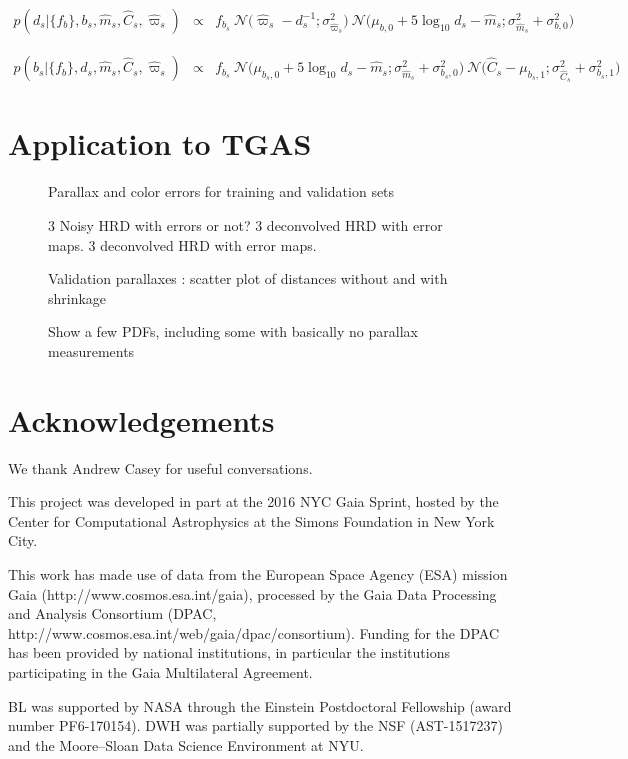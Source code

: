 \documentclass[aps,prd,showpacs,superscriptaddress,groupedaddress]{revtex4}  %
\newcommand{\eqn}[1]{\begin{eqnarray}#1\end{eqnarray}}
\begin{document}
\eqn{
	p\left(d_s \bigr\rvert \bigl\{ f_b \bigr\}, b_s, \hat{m}_s, \hat{C}_s, \hat{\varpi}_s\right) &\propto& f_{b_s} \ \mathcal{N}\bigl(\hat{\varpi}_s - d_s^{-1};\sigma_{\hat{\varpi}_s}^2 \bigr) \  \mathcal{N}\bigl( \mu_{b,0} + 5\log_{10}d_s  -\hat{m}_s ;\sigma_{\hat{m}_s}^2 + \sigma_{b,0}^2 \bigr) 
}


\eqn{
	p\left(b_s \bigr\rvert \bigl\{ f_b \bigr\}, d_s, \hat{m}_s, \hat{C}_s, \hat{\varpi}_s\right) &\propto& f_{b_s} \  \mathcal{N}\bigl( \mu_{b_s,0} + 5\log_{10}d_s  -\hat{m}_s ;\sigma_{\hat{m}_s}^2 + \sigma_{b_s,0}^2 \bigr) \  \mathcal{N}\bigl(\hat{C}_s - \mu_{b_s,1};\sigma_{\hat{C}_s}^2 + \sigma_{b_s,1}^2 \bigr)
}

\section{Application to TGAS}

\begin{figure}
\caption{Parallax and color errors for training and validation sets}
\end{figure}

\begin{figure}
\caption{3 Noisy HRD with errors or not? 3 deconvolved HRD with error maps. 3 deconvolved HRD with error maps. }
\end{figure}

\begin{figure}
\caption{Validation parallaxes : scatter plot of distances without and with shrinkage}
\end{figure}

\begin{figure}
\caption{Show a few PDFs, including some with basically no parallax measurements}
\end{figure}


\section{Acknowledgements}

We thank Andrew Casey for useful conversations.

This project was developed in part at the 2016 NYC Gaia Sprint, hosted by the Center for Computational Astrophysics at the Simons Foundation in New York City.

This work has made use of data from the European Space Agency (ESA) mission Gaia (http://www.cosmos.esa.int/gaia), processed by the Gaia Data Processing and Analysis Consortium (DPAC, http://www.cosmos.esa.int/web/gaia/dpac/consortium). Funding for the DPAC has been provided by national institutions, in particular the institutions participating in the Gaia Multilateral Agreement.

BL was supported by NASA through the Einstein Postdoctoral Fellowship (award number PF6-170154).
DWH was partially supported by the NSF (AST-1517237) and the Moore--Sloan Data Science Environment at NYU.




\appendix

\end{document}
